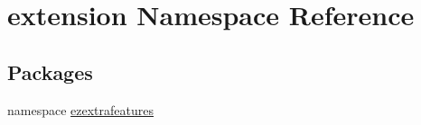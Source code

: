 \hypertarget{namespaceextension}{\section{extension Namespace Reference}
\label{namespaceextension}
}
\subsection*{Packages}
\begin{DoxyCompactItemize}
\item 
namespace \hyperlink{namespaceextension_1_1ezextrafeatures}{ezextrafeatures}
\end{DoxyCompactItemize}
